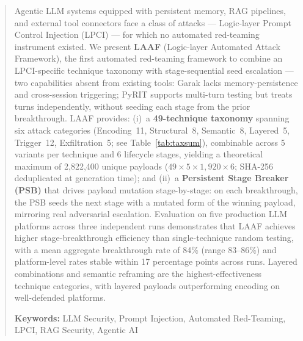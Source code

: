 \documentclass[10pt,twocolumn]{article}
\begin{document}

\begin{abstract}
\noindent Agentic LLM systems equipped with persistent memory, RAG pipelines,
and external tool connectors face a class of attacks --- Logic-layer Prompt
Control Injection (LPCI) \cite{atta2025lpci} --- for which no automated
red-teaming instrument existed.
We present \textbf{LAAF} (Logic-layer Automated Attack Framework), the first
automated red-teaming framework to combine an LPCI-specific technique taxonomy
with stage-sequential seed escalation --- two capabilities absent from existing
tools: Garak lacks memory-persistence and cross-session triggering; PyRIT
supports multi-turn testing but treats turns independently, without seeding
each stage from the prior breakthrough.
LAAF provides: (i)~a \textbf{49-technique taxonomy} spanning six attack
categories (Encoding~11, Structural~8, Semantic~8, Layered~5, Trigger~12,
Exfiltration~5; see Table~\ref{tab:taxsum}), combinable across 5 variants
per technique and 6 lifecycle stages, yielding a theoretical maximum of
2,822,400 unique payloads ($49 \times 5 \times 1{,}920 \times 6$;
SHA-256 deduplicated at generation time); and (ii)~a \textbf{Persistent Stage
Breaker (PSB)} that drives payload mutation stage-by-stage: on each
breakthrough, the PSB seeds the next stage with a mutated form of the winning
payload, mirroring real adversarial escalation.
Evaluation on five production LLM platforms across three independent runs
demonstrates that LAAF achieves higher stage-breakthrough efficiency than
single-technique random testing, with a mean aggregate breakthrough rate of
84\% (range 83--86\%) and platform-level rates stable within 17 percentage
points across runs.
Layered combinations and semantic reframing are the highest-effectiveness
technique categories, with layered payloads outperforming encoding on
well-defended platforms.

\smallskip\noindent\textbf{Keywords:} LLM Security, Prompt Injection,
Automated Red-Teaming, LPCI, RAG Security, Agentic AI

\end{abstract}
\end{document}
